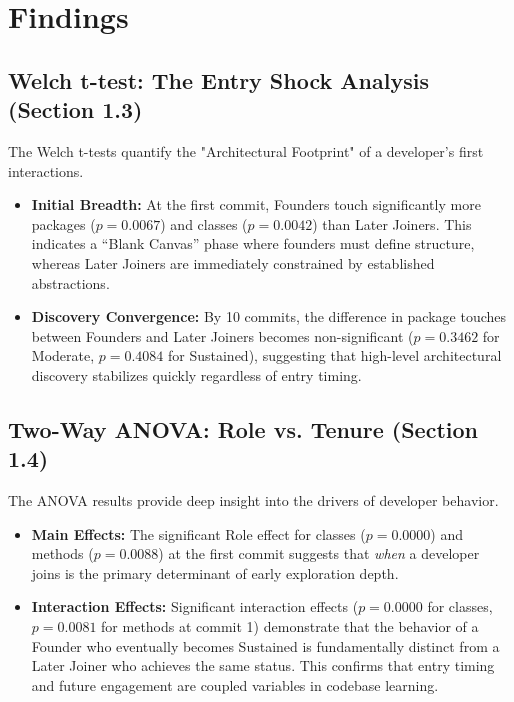 \section{Findings}
\subsection{Welch t-test: The Entry Shock Analysis (Section 1.3)}
The Welch t-tests quantify the "Architectural Footprint" of a developer's first interactions.
\begin{itemize}
\item \textbf{Initial Breadth:} At the first commit, Founders touch significantly more packages ($p=0.0067$) and classes ($p=0.0042$) than Later Joiners. This indicates a ``Blank Canvas'' phase where founders must define structure, whereas Later Joiners are immediately constrained by established abstractions.
\item \textbf{Discovery Convergence:} By 10 commits, the difference in package touches between Founders and Later Joiners becomes non-significant ($p=0.3462$ for Moderate, $p=0.4084$ for Sustained), suggesting that high-level architectural discovery stabilizes quickly regardless of entry timing.
\end{itemize}  
\subsection{Two-Way ANOVA: Role vs. Tenure (Section 1.4)}
The ANOVA results provide deep insight into the drivers of developer behavior.
\begin{itemize}
\item \textbf{Main Effects:} The significant Role effect for classes ($p=0.0000$) and methods ($p=0.0088$) at the first commit suggests that \textit{when} a developer joins is the primary determinant of early exploration depth.
\item \textbf{Interaction Effects:} Significant interaction effects ($p=0.0000$ for classes, $p=0.0081$ for methods at commit 1) demonstrate that the behavior of a Founder who eventually becomes Sustained is fundamentally distinct from a Later Joiner who achieves the same status. This confirms that entry timing and future engagement are coupled variables in codebase learning.
\end{itemize}  
